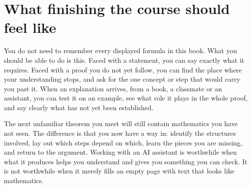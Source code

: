 \section{What finishing the course should feel like}\label{appE:sec:finishing}
You do not need to remember every displayed formula in this book. What you should be able to do is this. Faced with a statement, you can say exactly what it requires. Faced with a proof you do not yet follow, you can find the place where your understanding stops, and ask for the one concept or step that would carry you past it. When an explanation arrives, from a book, a classmate or an assistant, you can test it on an example, see what role it plays in the whole proof, and say clearly what has not yet been established.

The next unfamiliar theorem you meet will still contain mathematics you have not seen. The difference is that you now have a way in: identify the structures involved, lay out which steps depend on which, learn the pieces you are missing, and return to the argument. Working with an AI assistant is worthwhile when what it produces helps you understand and gives you something you can check. It is not worthwhile when it merely fills an empty page with text that looks like mathematics.
